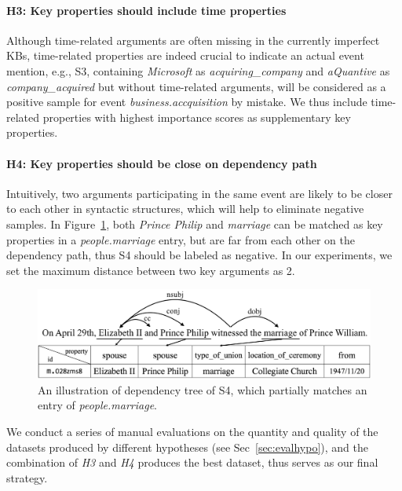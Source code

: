 \paragraph{H3: Key properties should include time properties}
Although time-related arguments are often missing in the currently imperfect KBs, time-related properties are indeed
crucial to indicate an actual event mention, e.g., S3, containing  \emph{Microsoft} as \emph{acquiring\_company} and \emph{aQuantive} as \emph{company\_acquired} but without time-related arguments, will be considered as a positive sample for event \emph{business.accquisition} by mistake.
We thus include time-related properties with highest importance scores  as supplementary key properties.

\paragraph{H4: Key properties should be close on dependency path}
Intuitively, two arguments participating in the same event are likely to be closer to each other in syntactic structures, which will help to eliminate negative samples. In Figure~\ref{fig:2},  both  \emph{Prince Philip} and \emph{marriage} can be matched as key properties in a \textit{people.marriage} entry,  but are far from each other on the dependency path, thus S4 should be labeled as negative.
In our experiments, we set the maximum distance between two key arguments as 2.

\begin{figure}
\centering
	\includegraphics[width=.47\textwidth]{deppath}
	\caption{An illustration of dependency tree of S4, which partially matches an entry of \emph{people.marriage}. \label{fig:2}}
\end{figure}

We conduct a series of manual evaluations on the quantity and quality of the
 datasets produced by different hypotheses (see Sec~\ref{sec:evalhypo}),
and the combination of  \emph{H3} and \emph{H4} produces the best dataset, thus serves
as our final strategy.
